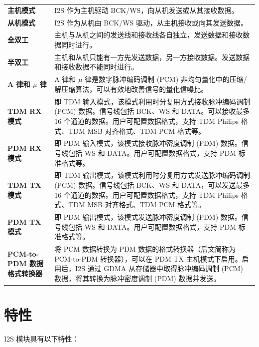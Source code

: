 \documentclass[main\_\_CN.tex]{subfiles}
\begin{document}
\begin{longtable}[c]{ R{5cm} p{10cm} }

\textbf{主机模式}     & I2S 作为主机驱动 BCK/WS，向从机发送或从其接收数据。 \\ 
\textbf{从机模式}      & I2S 作为从机由 BCK/WS 驱动，从主机接收或向其发送数据。 \\
\textbf{全双工} & 主机与从机之间的发送线和接收线各自独立，发送数据和接收数据同时进行。\\
\textbf{半双工} & 主机和从机只能有一方先发送数据，另一方接收数据。发送数据和接收数据不能同时进行。 \\
\textbf{A 律和 $\mu$ 律} & A 律和 \textrm{$\mu$} 律是数字脉冲编码调制 (PCM) 非均匀量化中的压缩/解压缩算法，可以有效地改善信号的量化信噪比。 \\
\textbf{TDM RX 模式} & 即 TDM 输入模式，该模式利用时分复用方式接收脉冲编码调制 (PCM) 数据。信号线包括 BCK、WS 和 DATA。可以接收最多 16 个通道的数据。用户可配置数据格式，支持 TDM Philips 格式、TDM MSB 对齐格式、TDM PCM 格式等。\\
\textbf{PDM RX 模式} & 即 PDM 输入模式，该模式接收脉冲密度调制 (PDM) 数据。信号线包括 WS 和 DATA。用户可配置数据格式，支持 PDM 标准格式等。\\
\textbf{TDM TX 模式} & 即 TDM 输出模式，该模式利用时分复用方式发送脉冲编码调制 (PCM) 数据。信号线包括 BCK、WS 和 DATA，可以发送最多 16 个通道的数据。用户可配置数据格式，支持 TDM Philips 格式、TDM MSB 对齐格式、TDM PCM 格式等。\\
\textbf{PDM TX 模式} & 即 PDM 输出模式，该模式发送脉冲密度调制 (PDM) 数据。信号线包括 WS 和 DATA。用户可配置数据格式，支持 PDM 标准格式等。\\
\textbf{PCM-to-PDM 数据格式转换器} & 将 PCM 数据转换为 PDM 数据的格式转换器（后文简称为 PCM-to-PDM 转换器），可以在 PDM TX 主机模式下启用。启用后，I2S 通过 GDMA 从存储器中取得脉冲编码调制 (PCM) 数据，将其转换为脉冲密度调制 (PDM) 数据并发送。\\
\end{longtable}

\section{特性}

I2S 模块具有以下特性：
\end{document}
